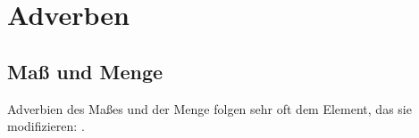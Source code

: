 %
%
%
%
%

\section{Adverben}

\subsection{Maß und Menge} Adverbien des Maßes und der Menge folgen sehr oft dem Element, das sie modifizieren:  .

